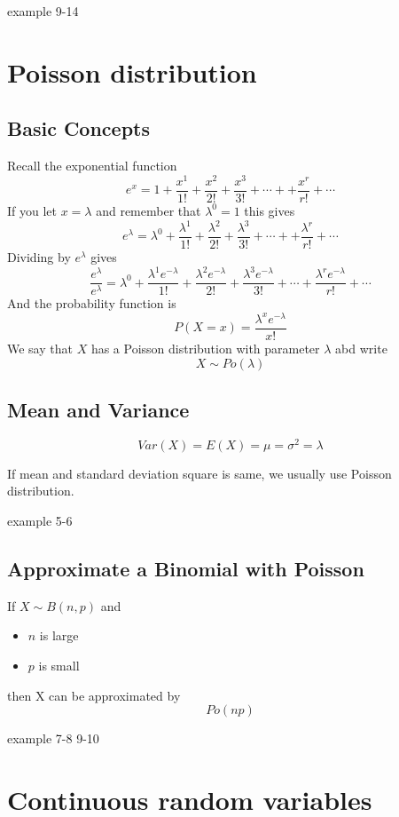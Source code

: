 \documentclass[a4paper]{article}
\begin{document}
\begin{eg}
	example 9-14
\end{eg}
\section{Poisson distribution}
\subsection{Basic Concepts}
Recall the exponential function
\[
	e^x=1+\frac{x^1}{1!}+\frac{x^2}{2!}+\frac{x^3}{3!}+\cdots++\frac{x^r}{r!}+\cdots
\]
If you let $x=\lambda$ and remember that $\lambda^0=1$ this gives
\[
	e^{\lambda}=\lambda^0+\frac{\lambda^1}{1!}+\frac{\lambda^2}{2!}+\frac{\lambda^3}{3!}+\cdots++\frac{\lambda^r}{r!}+\cdots
\]
Dividing by $e^{\lambda}$ gives
\[
	\frac{e^{\lambda}}{e^{\lambda}}=\lambda^0+\frac{\lambda^1e^{-\lambda}}{1!}+\frac{\lambda^2e^{-\lambda}}{2!}+\frac{\lambda^3e^{-\lambda}}{3!}+\cdots+\frac{\lambda^re^{-\lambda}}{r!}+\cdots
\]
And the probability function is
\[
	P(X=x)=\frac{\lambda^xe^{-\lambda}}{x!}
\]
We say that $X$ has a Poisson distribution with parameter $\lambda$ abd write
\[
	X\sim Po(\lambda)
\]
\subsection{Mean and Variance}
\[
	Var(X)=E(X)=\mu=\sigma^2=\lambda
\]
\begin{lemma}
	If mean and standard deviation square is same, we usually use Poisson distribution.
\end{lemma}
\begin{eg}
	example 5-6
\end{eg}

\subsection{Approximate a Binomial with Poisson}
If $X\sim B(n,p)$ and\\
\begin{itemize}
	\item $n$ is large
	\item $p$ is small
\end{itemize}
then X can be approximated by
\[
	Po(np)
\]
\begin{eg}
	example 7-8 9-10
\end{eg}
\section{Continuous random variables}
\end{document}
